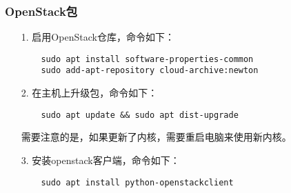 \documentclass[a4paper,left=2.5cm,right=2.5cm,11pt]{article}
\begin{document}
\subsubsection{OpenStack包}
	\begin{itemize}
		\item[1.] 启用OpenStack仓库，命令如下：
		\begin{lstlisting}
	sudo apt install software-properties-common
	sudo add-apt-repository cloud-archive:newton
		\end{lstlisting}

		\item[2.] 在主机上升级包，命令如下：
		\begin{lstlisting}
	sudo apt update && sudo apt dist-upgrade
		\end{lstlisting}

		需要注意的是，如果更新了内核，需要重启电脑来使用新内核。

		\item[3.] 安装openstack客户端，命令如下：
		\begin{lstlisting}
	sudo apt install python-openstackclient
		\end{lstlisting}
	\end{itemize}
\end{document}
